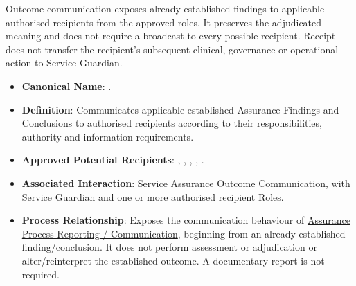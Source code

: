 Outcome communication exposes already established findings to applicable authorised recipients from the approved roles. It preserves the adjudicated meaning and does not require a broadcast to every possible recipient. Receipt does not transfer the recipient's subsequent clinical, governance or operational action to Service Guardian.



\begin{itemize}

\item
\textbf{Canonical Name}: \texttt{}.



\item
\textbf{Definition}: Communicates applicable established Assurance Findings and Conclusions to authorised recipients according to their responsibilities, authority and information requirements.



\item
\textbf{Approved Potential Recipients}: \texttt{}, \texttt{}, \texttt{}, \texttt{}, \texttt{}.



\item
\textbf{Associated Interaction}: \href{https://github.com/fhirfactory/harmonia/blob/98410db60155198a75f74c79d98060070209faa1/docs/markdown/03-business-architecture/collaborations-interactions/interactions.md\#service-assurance-outcome-communication}{Service Assurance Outcome Communication}, with Service Guardian and one or more authorised recipient Roles.



\item
\textbf{Process Relationship}: Exposes the communication behaviour of \href{https://github.com/fhirfactory/harmonia/blob/98410db60155198a75f74c79d98060070209faa1/docs/markdown/03-business-architecture/processes/business-processes.md\#assurance-process-reporting-communication}{Assurance Process Reporting /\allowbreak{} Communication}, beginning from an already established finding/\allowbreak{}conclusion. It does not perform assessment or adjudication or alter/\allowbreak{}reinterpret the established outcome. A documentary report is not required.




\end{itemize}
